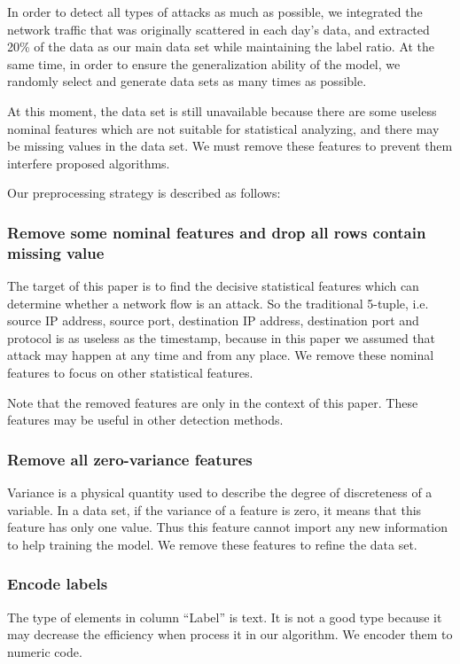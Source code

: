 \documentclass[journal]{IEEEtran}
\begin{document}
In order to detect all types of attacks as much as possible, we integrated the network traffic that was originally scattered in each day's data, and extracted 20\% of the data as our main data set while maintaining the label ratio. At the same time, in order to ensure the generalization ability of the model, we randomly select and generate data sets as many times as possible.

At this moment, the data set is still unavailable because there are some useless nominal features which are not suitable for statistical analyzing, and there may be missing values in the data set. We must remove these features to prevent them interfere proposed algorithms.

Our preprocessing strategy is described as follows:

\subsubsection{Remove some nominal features and drop all rows contain missing value}
The target of this paper is to find the decisive statistical features which can determine whether a network flow is an attack. So the traditional 5-tuple, i.e. source IP address, source port, destination IP address, destination port and protocol is as useless as the timestamp, because in this paper we assumed that attack may happen at any time and from any place. We remove these nominal features to focus on other statistical features. 

Note that the removed features are only in the context of this paper. These features may be useful in other detection methods.

\subsubsection{Remove all zero-variance features}

Variance is a physical quantity used to describe the degree of discreteness of a variable. In a data set, if the variance of a feature is zero, it means that this feature has only one value. Thus this feature cannot import any new information to help training the model. We remove these features to refine the data set.

\subsubsection{Encode labels}

The type of elements in column ``Label'' is text. It is not a good type because it may decrease the efficiency when process it in our algorithm. We encoder them to numeric code.
\end{document}
